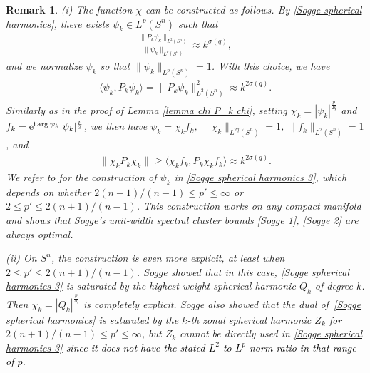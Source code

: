 \documentclass[12pt]{amsart}
\newcommand{\e}{{\rm e}}
\newcommand\I{\mathrm{i}}
\newcommand\jc[1]{\textcolor{black}{#1}}
\newtheorem{remark}[theorem]{Remark}
\begin{document}
\begin{remark}
(i) The function $\chi$ can be constructed as follows. 
By \eqref{Sogge spherical harmonics}, there exists $\psi_k\in L^p(S^n)$ such that
\begin{align}\label{Sogge spherical harmonics 3}
    \frac{\|P_k\psi_k\|_{L^{2}(S^n)}}{\|\psi_k\|_{L^p(S^n)}}\approx k^{\sigma(q)},
\end{align}
and we normalize $\psi_k$ so that $\|\psi_k\|_{L^p(S^n)}=1$. 
With this choice, we have
\begin{align}
\langle\psi_k,P_k\psi_k\rangle=\|P_k\psi_k\|_{L^2(S^n)}^2\approx k^{2\sigma(q)}.
\end{align}
Similarly as in the proof of Lemma \ref{lemma chi P_k chi}, setting $\chi_k=|\psi_k|^{\frac{p}{2q}}$ and $f_k=\e^{\I\arg \psi_k}|\psi_k|^{\frac{p}{2}}$, we then have $\psi_k=\chi_k f_k$, $\|\chi_k\|_{L^{2q}(S^n)}=1$, $\|f_k\|_{L^{2}(S^n)}=1$, and
\begin{align}
 \|\chi_k P_k\chi_k\|\geq \langle \chi_k f_k,P_k\chi_k f_k\rangle\approx k^{2\sigma(q)}.
\end{align}
We refer to \cite[Chapter 5.1]{MR3645429} for the construction of $\psi_k$ in \eqref{Sogge spherical harmonics 3}, which depends on whether $2(n+1)/(n-1)\leq p'\leq \infty$ or $2\leq p'\leq 2(n+1)/(n-1)$. This construction works on any compact manifold and shows that Sogge's unit-width spectral cluster bounds \eqref{Sogge 1}, \eqref{Sogge 2} are always optimal. 

\noindent (ii)
On $S^n$, the construction is even more explicit, at least when $2\leq p'\leq 2(n+1)/(n-1)$.
Sogge \cite{MR835795} showed that in this case, \eqref{Sogge spherical harmonics 3} is saturated by the highest weight spherical harmonic $Q_k$ of degree $k$. Then $\chi_k=|Q_k|^{\frac{p}{2q}}$ is completely explicit. Sogge also showed that the dual of~\eqref{Sogge spherical harmonics} is saturated by the $k$-th zonal spherical harmonic $Z_k$ for $2(n+1)/(n-1)\leq p'\leq \infty$, but $Z_k$ cannot be directly used in \eqref{Sogge spherical harmonics 3} \jc{since it does not have the stated $L^2$ to $L^p$ norm ratio in that range of $p$.}
\end{remark}
\end{document}

